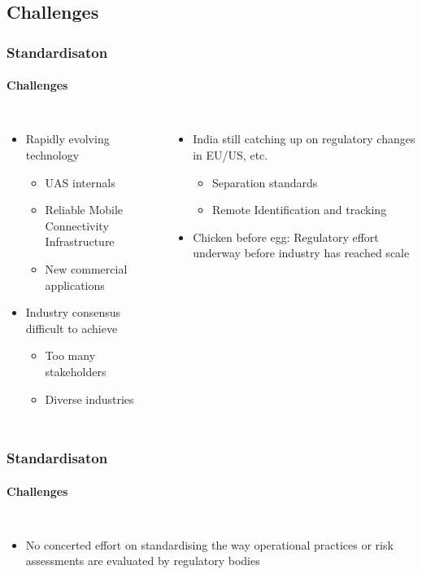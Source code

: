 \documentclass[usenames,dvipsnames,aspectratio=169,serif]{beamer}
\begin{document}
\subsection{Challenges}
\begin{frame}[fragile] %
   \frametitle{Standardisaton}
   \framesubtitle{Challenges}
   \begin{columns}[t]
      \begin{itemize}
         \item Rapidly evolving technology
            \begin{itemize}
               \item UAS internals
               \item Reliable Mobile Connectivity Infrastructure
               \item New commercial applications
            \end{itemize}
         \item Industry consensus difficult to achieve
            \begin{itemize}
                  \item Too many stakeholders
                  \item Diverse industries
            \end{itemize}
      \end{itemize}
      \begin{itemize}
         \item India still catching up on regulatory changes in EU/US, etc.
            \begin{itemize}
               \item Separation standards
               \item Remote Identification and tracking
            \end{itemize}
         \item Chicken before egg: Regulatory effort underway before industry has reached scale
      \end{itemize}
   \end{columns}
\end{frame}


\begin{frame}[fragile] %
   \frametitle{Standardisaton}
   \framesubtitle{Challenges}
   \begin{columns}[t]
      \begin{itemize}
         \item No concerted effort on standardising the way operational practices or risk assessments are evaluated by regulatory bodies
      \end{itemize}
   \end{columns}
\end{frame}
\end{document}
